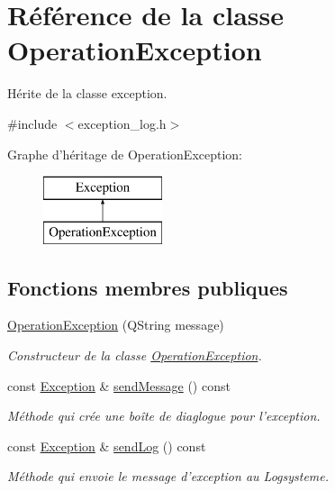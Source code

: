 \hypertarget{class_operation_exception}{\section{Référence de la classe Operation\-Exception}
\label{class_operation_exception}
}


Hérite de la classe exception.  




{\ttfamily \#include $<$exception\-\_\-log.\-h$>$}

Graphe d'héritage de Operation\-Exception\-:\begin{figure}[H]
\begin{center}
\leavevmode
\includegraphics[height=2.000000cm]{class_operation_exception}
\end{center}
\end{figure}
\subsection*{Fonctions membres publiques}
\begin{DoxyCompactItemize}
\item 
\hyperlink{class_operation_exception_a4175f17d45ddeb69e496f46d10ee7715}{Operation\-Exception} (Q\-String message)
\begin{DoxyCompactList}\small\item\em Constructeur de la classe \hyperlink{class_operation_exception}{Operation\-Exception}. \end{DoxyCompactList}\item 
\hypertarget{class_operation_exception_ad0bc3c8efcd32fb7940c02cfbbe2f188}{const \hyperlink{class_exception}{Exception} \& \hyperlink{class_operation_exception_ad0bc3c8efcd32fb7940c02cfbbe2f188}{send\-Message} () const }\label{class_operation_exception_ad0bc3c8efcd32fb7940c02cfbbe2f188}

\begin{DoxyCompactList}\small\item\em Méthode qui crée une boîte de diaglogue pour l'exception. \end{DoxyCompactList}\item 
\hypertarget{class_operation_exception_aeef9c6fa3863aa3ab4c233077f090a65}{const \hyperlink{class_exception}{Exception} \& \hyperlink{class_operation_exception_aeef9c6fa3863aa3ab4c233077f090a65}{send\-Log} () const }\label{class_operation_exception_aeef9c6fa3863aa3ab4c233077f090a65}

\begin{DoxyCompactList}\small\item\em Méthode qui envoie le message d'exception au Logsysteme. \end{DoxyCompactList}\end{DoxyCompactItemize}
